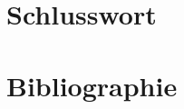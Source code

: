 \documentclass[10pt,a4paper,oneside]{99_fhnwreport_disposition}
\begin{document}
\section{Schlusswort}\label{sec:schlusswort}

\clearpage

\section{Bibliographie}\label{sec:bibliographie}

\clearpage

\begin{appendix}

\end{appendix}
\end{document}
